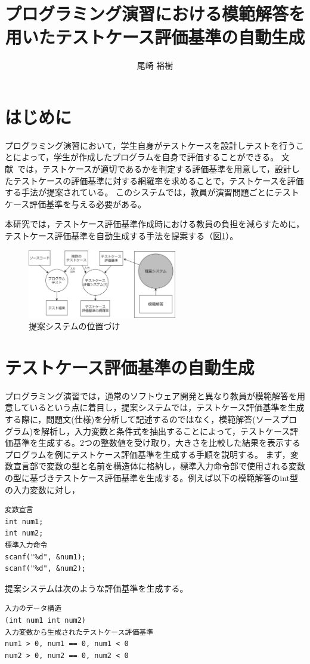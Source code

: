 \documentclass[10pt]{tpu-abst}
\author{尾崎 裕樹}
\title{プログラミング演習における模範解答を\\用いたテストケース評価基準の自動生成}
\begin{document}
%
\maketitle
%
%

\section{ はじめに}
%
プログラミング演習において，学生自身がテストケースを設計しテストを行うことによって，学生が作成したプログラムを自身で評価することができる。
文献~\cite{a1}では，テストケースが適切であるかを判定する評価基準を用意して，設計したテストケースの評価基準に対する網羅率を求めることで，テストケースを評価する手法が提案されている。
このシステムでは，教員が演習問題ごとにテストケース評価基準を与える必要がある。

本研究では，テストケース評価基準作成時における教員の負担を減らすために，テストケース評価基準を自動生成する手法を提案する（図\ref{cap1}）。
\begin{figure}[h]
  \centering
  \includegraphics[width=65mm]{提案システムの位置づけ.png}
  \caption{提案システムの位置づけ}
  \label{cap1}
\end{figure}
%
\section{テストケース評価基準の自動生成}
プログラミング演習では，通常のソフトウェア開発と異なり教員が模範解答を用意しているという点に着目し，提案システムでは，テストケース評価基準を生成する際に，問題文(仕様)を分析して記述するのではなく，模範解答(ソースプログラム)を解析し，入力変数と条件式を抽出することによって，テストケース評価基準を生成する。2つの整数値を受け取り，大きさを比較した結果を表示するプログラムを例にテストケース評価基準を生成する手順を説明する。
まず，変数宣言部で変数の型と名前を構造体に格納し，標準入力命令部で使用される変数の型に基づきテストケース評価基準を生成する。例えば以下の模範解答のint型の入力変数に対し，
\begin{lstlisting}
変数宣言
int num1;
int num2;
標準入力命令
scanf("%d", &num1);
scanf("%d", &num2);
\end{lstlisting}
提案システムは次のような評価基準を生成する。
\begin{lstlisting}
入力のデータ構造
(int num1 int num2)
入力変数から生成されたテストケース評価基準
num1 > 0, num1 == 0, num1 < 0
num2 > 0, num2 == 0, num2 < 0
\end{lstlisting}
\end{document}

